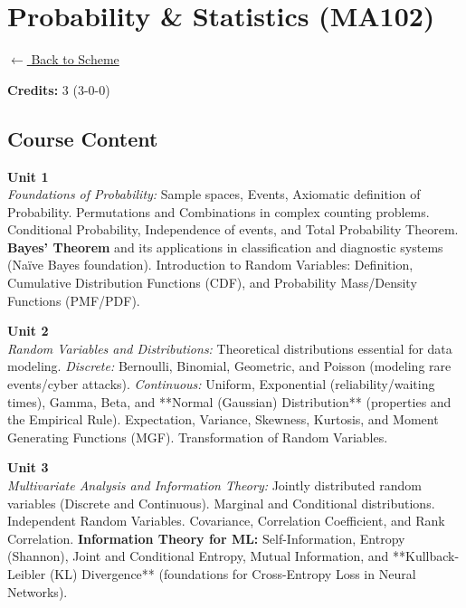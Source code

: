 \section*{Probability \& Statistics (MA102)}
\label{course:MA102}

\noindent \small{\hyperref[main:scheme]{$\leftarrow$ Back to Scheme}} \vspace{0.5cm}

\noindent \textbf{Credits:} 3 (3-0-0)

\subsection*{Course Content}
\noindent\textbf{Unit 1} \\
\textit{Foundations of Probability:} Sample spaces, Events, Axiomatic definition of Probability. Permutations and Combinations in complex counting problems. Conditional Probability, Independence of events, and Total Probability Theorem. \textbf{Bayes’ Theorem} and its applications in classification and diagnostic systems (Naïve Bayes foundation). Introduction to Random Variables: Definition, Cumulative Distribution Functions (CDF), and Probability Mass/Density Functions (PMF/PDF).

\vspace{0.3cm}

\noindent\textbf{Unit 2} \\
\textit{Random Variables and Distributions:} Theoretical distributions essential for data modeling. \textit{Discrete:} Bernoulli, Binomial, Geometric, and Poisson (modeling rare events/cyber attacks). \textit{Continuous:} Uniform, Exponential (reliability/waiting times), Gamma, Beta, and **Normal (Gaussian) Distribution** (properties and the Empirical Rule). Expectation, Variance, Skewness, Kurtosis, and Moment Generating Functions (MGF). Transformation of Random Variables.

\vspace{0.3cm}

\noindent\textbf{Unit 3} \\
\textit{Multivariate Analysis and Information Theory:} Jointly distributed random variables (Discrete and Continuous). Marginal and Conditional distributions. Independent Random Variables. Covariance, Correlation Coefficient, and Rank Correlation. \textbf{Information Theory for ML:} Self-Information, Entropy (Shannon), Joint and Conditional Entropy, Mutual Information, and **Kullback-Leibler (KL) Divergence** (foundations for Cross-Entropy Loss in Neural Networks).

